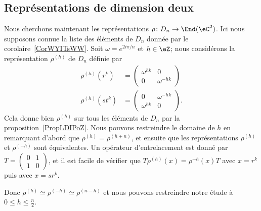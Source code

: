 \subsection{Représentations de dimension deux}

Nous cherchons maintenant les représentations \( \rho\colon D_n\to \End(\eC^2)\). Ici nous supposons connue la liste des éléments de \( D_n\) donnée par le corolaire~\ref{CorWYITsWW}. Soit \( \omega= e^{2i\pi/n}\) et \( h\in \eZ\); nous considérons la représentation \( \rho^{(h)}\) de \( D_n\) définie par
\begin{subequations}
    \begin{align}
        \rho^{(h)}(r^k)&=\begin{pmatrix}
            \omega^{hk}    &   0    \\
            0    &   \omega^{-hk}
        \end{pmatrix}\\
        \rho^{(h)}(st^k)&=\begin{pmatrix}
            0    &   \omega^{-hk}    \\
            \omega^{hk}    &   0
        \end{pmatrix}.
    \end{align}
\end{subequations}
Cela donne bien \( \rho^{(h)}\) sur tous les éléments de \( D_n\) par la proposition~\ref{PropLDIPoZ}. Nous pouvons restreindre le domaine de \( h\) en remarquant d'abord que \( \rho^{(h)}=\rho^{(h+n)}\), et ensuite que les représentations \( \rho^{(h)}\) et \( \rho^{(-h)}\) sont équivalentes. Un opérateur d'entrelacement est donné par \( T=\begin{pmatrix}
    0    &   1    \\
    1    &   0
\end{pmatrix}\), et il est facile de vérifier que \( T\rho^{(h)}(x)=\rho^{-h}(x)T\) avec \( x=r^k\) puis avec \( x=sr^k\).

Donc \( \rho^{(h)}\simeq\rho^{(-h)}\simeq\rho^{(n-h)}\) et nous pouvons restreindre notre étude à \( 0\leq h\leq \frac{ n }{2}\).

